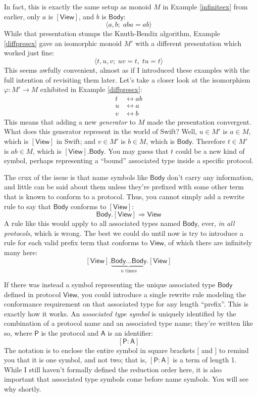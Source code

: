\documentclass[headsepline,bibliography=totoc]{scrreport}
\newcommand{\namesym}[1]{\mathsf{#1}}
\newcommand{\proto}[1]{\bm{\mathsf{#1}}}
\newcommand{\protosym}[1]{[\proto{#1}]}
\newcommand{\assocsym}[2]{[\proto{#1}\colon\namesym{#2}]}
\theoremstyle{definition}
\theoremstyle{definition}
\theoremstyle{definition}
\begin{document}
In fact, this is exactly the same setup as monoid $M$ in Example \ref{infiniteex} from earlier, only $a$ is $\protosym{View}$, and $b$ is $\namesym{Body}$:
\[\langle a, b;\;aba=ab \rangle\]
While that presentation stumps the Knuth-Bendix algorithm, Example \ref{diffpresex} gave an isomorphic monoid $M'$ with a different presentation which worked just fine:
\[\langle t, u, v;\;uv=t,\;tu=t\rangle\]
This seems awfully convenient, almost as if I introduced these examples with the full intention of revisiting them later. Let's take a closer look at the isomorphism $\varphi\colon M'\rightarrow M$ exhibited in Example \ref{diffpresex}:
\begin{align*}
t&\leftrightarrow ab\\
u&\leftrightarrow a\\
v&\leftrightarrow b
\end{align*}
This means that adding a new \emph{generator} to $M$ made the presentation convergent. What does this generator represent in the world of Swift? Well, $u\in M'$ is $a\in M$, which is $\protosym{View}$ in Swift; and $v\in M'$ is $b\in M$, which is $\namesym{Body}$. Therefore $t\in M'$ is $ab\in M$, which is $\protosym{View}.\namesym{Body}$. You may guess that $t$ could be a new kind of symbol, perhaps representing a ``bound'' associated type inside a specific protocol.

 The crux of the issue is that name symbols like $\namesym{Body}$ don't carry any information, and little can be said about them unless they're prefixed with some other term that is known to conform to a protocol. Thus, you cannot simply add a rewrite rule to say that $\namesym{Body}$ conforms to $\protosym{View}$:
\[\namesym{Body}.\protosym{View}\Rightarrow\namesym{View}\]
A rule like this would apply to all associated types named $\namesym{Body}$, ever, \emph{in all protocols}, which is wrong. The best we could do until now is try to introduce a rule for each valid prefix term that conforms to $\proto{View}$, of which there are infinitely many here:
\[\protosym{View}.\underbrace{\namesym{Body}\ldots\namesym{Body}}_{\textrm{$n$ times}}.\protosym{View}\]

If there was instead a symbol representing the unique associated type $\namesym{Body}$ defined in protocol $\proto{View}$, you could introduce a single rewrite rule modeling the conformance requirement on that associated type for any length ``prefix''. This is exactly how it works. An \emph{associated type symbol} is uniquely identified by the combination of a protocol name and an associated type name; they're written like so, where $\proto{P}$ is the protocol and $\namesym{A}$ is an identifier:
\[\assocsym{P}{A}\]
The notation is to enclose the entire symbol in square brackets [ and ] to remind you that it is one symbol, and not two; that is, $\assocsym{P}{A}$ is a term of length 1. While I still haven't formally defined the reduction order here, it is also important that associated type symbols come before name symbols. You will see why shortly.
\end{document}
